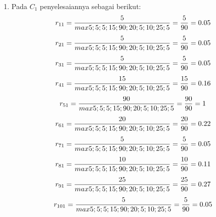 \documentclass[a4paper,twoside]{article}
\begin{document}
\begin{enumerate}
\begin{enumerate}
	\item Pada $C_{1}$ penyelesaiannya sebagai berikut:
\begin{displaymath}
r_{11} = \frac{5}{max {5;5;5;15;90;20;5;10;25;5}} = \frac{5}{90} = 0.05\\
\end {displaymath}
\begin{displaymath}
r_{21} = \frac{5}{max {5;5;5;15;90;20;5;10;25;5}} = \frac{5}{90} = 0.05\\
\end{displaymath}
\begin{displaymath}
r_{31} = \frac{5}{max {5;5;5;15;90;20;5;10;25;5}} = \frac{5}{90} = 0.05\\
\end {displaymath}
\begin{displaymath}
r_{41} = \frac{15}{max {5;5;5;15;90;20;5;10;25;5}} = \frac{15}{90} = 0.16\\
\end {displaymath}
\begin{displaymath}
r_{51} = \frac{90}{max {5;5;5;15;90;20;5;10;25;5}} = \frac{90}{90} = 1\\
\end {displaymath}
\begin{displaymath}
r_{61} = \frac{20}{max {5;5;5;15;90;20;5;10;25;5}} = \frac{20}{90} = 0.22\\
\end {displaymath}
\begin{displaymath}
r_{71} = \frac{5}{max {5;5;5;15;90;20;5;10;25;5}} = \frac{5}{90} = 0.05\\
\end {displaymath}
\begin{displaymath}
r_{81} = \frac{10}{max {5;5;5;15;90;20;5;10;25;5}} = \frac{10}{90} = 0.11\\
\end {displaymath}
\begin{displaymath}
r_{91} = \frac{25}{max {5;5;5;15;90;20;5;10;25;5}} = \frac{25}{90} = 0.27\\
\end {displaymath}
\begin{displaymath}
r_{101} = \frac{5}{max {5;5;5;15;90;20;5;10;25;5}} = \frac{5}{90} = 0.05\\
\end {displaymath}


\end{enumerate}
\end{enumerate}
\end{document}
